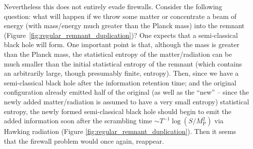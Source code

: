 \documentclass[12pt]{article}
\newcommand{\2}{$^2$}
\newcommand{\3}{$^3$}
\newcommand{\4}{$_4$}
\newcommand{\5}{$_5$}
\begin{document}
Nevertheless this does not entirely evade firewalls. Consider the following question: what will happen if we throw some matter or concentrate a beam of energy (with mass/energy much greater than the Planck mass) into the remnant (Figure~\ref{fig:regular_remnant_duplication})? One expects that a semi-classical black hole will form. One important point is that, although the mass is greater than the Planck mass, the statistical entropy of the matter/radiation can be much smaller than the initial statistical entropy of the remnant (which contains an arbitrarily large, though presumably finite, entropy). Then, since we have a semi-classical black hole after the information retention time; and the original configuration already emitted half of the original (as well as the ``new'' -- since the newly added matter/radiation is assumed to have a very small entropy) statistical entropy, the newly formed semi-classical black hole should begin to emit the added information soon after the scrambling time $\sim T^{-1} \log (S/M_{\text{P}}^2)$ \cite{Hayden:2007cs} via Hawking radiation (Figure \ref{fig:regular_remnant_duplication}). Then it seems that the firewall problem would once again, reappear. 
\end{document}
